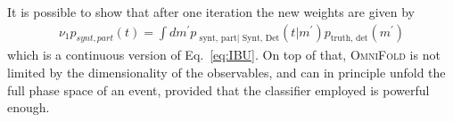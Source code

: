 It is possible to show that after one iteration the new weights are given by
%
\begin{align}
\nu_1 p_{synt, part}(t) = \int dm^{'} p_{\text{ synt, part| Synt, Det}} (t | m^{'}) p_{\text{truth, det}}(m^{'})
\end{align}
%
which is a continuous version of Eq.~\ref{eq:IBU}. On top of that, \textsc{OmniFold} is not limited by the dimensionality of the observables, and can in principle unfold the full phase space of an event, provided that the classifier employed is powerful enough.